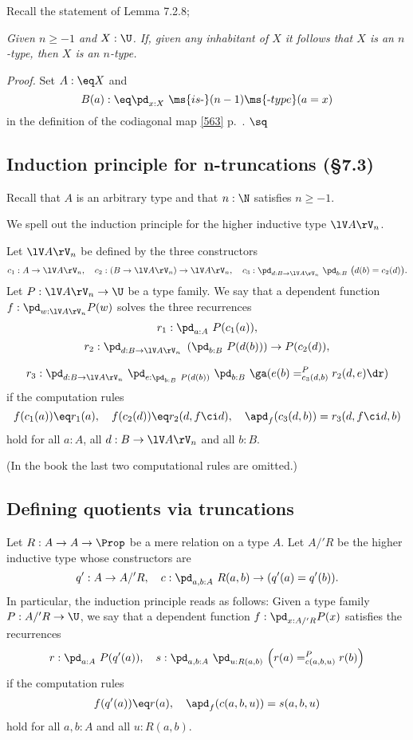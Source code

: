 \documentclass[12pt]{article}
\begin{document}
Recall the statement of Lemma 7.2.8;

\nn\emph{Given $n\ge-1$ and $X:\U$. If, given any inhabitant of $X$ it follows that $X$ is an $n$-type, then $X$ is an $n$-type.}

\nn\emph{Proof.} Set $A:\eq X$ and 
$$
B(a):\eq\pd_{x:X}\ \ms{is\text-}(n-1)\ms{\text-type}(a=x)
$$ 
in the definition of the codiagonal map \eqref{563} p.~\pageref{563}. $\sq$



\subsection{Induction principle for n-truncations (\S7.3)}

Recall that $A$ is an arbitrary type and that $n:\N$ satisfies $n\ge-1$.

We spell out the induction principle for the higher inductive type $\lV A\rV_n$.

Let $\lV A\rV_n$ be defined by the three constructors 
$$
c_1:A\to \lV A\rV_n,\quad c_2:(B\to \lV A\rV_n)\to \lV A\rV_n,\quad c_3:\pd_{d:B\to \lV A\rV_n}\ \pd_{b:B}\ \big(d(b)=c_2(d)\big).
$$ 
Let $P:\lV A\rV_n\to\U$ be a type family. We say that a dependent function $f:\pd_{w:\lV A\rV_n}P(w)$ solves the three recurrences 
$$
r_1:\pd_{a:A}\ P(c_1(a)),
$$ 
$$
r_2:\pd_{d:B\to \lV A\rV_n}\ \left(\pd_{b:B}\ P(d(b))\right)\to P(c_2(d)),
$$

$$
r_3:\pd_{d:B\to \lV A\rV_n}\ \pd_{e:\pd_{b:B}\ P(d(b))}\ \pd_{b:B}\ \ga(e(b)=^P_{c_3(d,b)}r_2(d,e)\dr)
$$ 
if the computation rules
$$
f(c_1(a))\eq r_1(a),\quad f(c_2(d))\eq r_2(d,f\ci d),\quad\apd_f(c_3(d,b))=r_3(d,f\ci d,b)
$$ 
hold for all $a:A$, all $d:B\to \lV A\rV_n$ and all $b:B$. 

(In the book the last two computational rules are omitted.)


\subsection{Defining quotients via truncations}\label{qvt}

Let $R:A\to A\to\Prop$ be a mere relation on a type $A$. Let $A/'R$ be the higher inductive type whose constructors are 
$$
q':A\to A/'R,\quad c:\pd_{a,b:A}\ R(a,b)\to(q'(a)=q'(b)).
$$ 
In particular, the induction principle reads as follows: Given a type family $P:A/'R\to\U$, we say that a dependent function $f:\pd_{x:A/'R}P(x)$ satisfies the recurrences 
$$
r:\pd_{a:A}\ P(q'(a)),\quad s:\pd_{a,b:A}\ \pd_{u:R(a,b)}\ \Big(r(a)=^P_{c(a,b,u)}r(b)\Big)
$$ 
if the computation rules 
$$
f(q'(a))\eq r(a),\quad\apd_f(c(a,b,u))=s(a,b,u)
$$ 
hold for all $a,b:A$ and all $u:R(a,b)$. 
\end{document}

